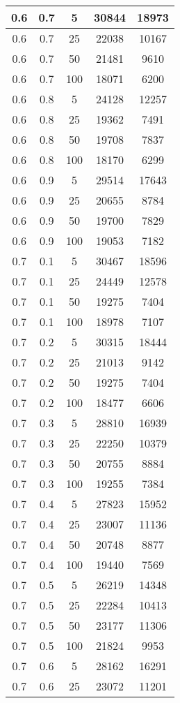 \begin{appendices}
\begin{longtable}[c]{|c|c|c|c|c|}
	\hline
	0.6& 0.7& 5& 30844&  18973\\
	\hline
	0.6& 0.7& 25& 22038&  10167\\
	\hline
	0.6& 0.7& 50& 21481&  9610\\
	\hline
	0.6& 0.7& 100& 18071&  6200\\
	\hline
	0.6& 0.8& 5& 24128&  12257\\
	\hline
	0.6& 0.8& 25& 19362&  7491\\
	\hline
	0.6& 0.8& 50& 19708&  7837\\
	\hline
	0.6& 0.8& 100& 18170&  6299\\
	\hline
	0.6& 0.9& 5& 29514&  17643\\
	\hline
	0.6& 0.9& 25& 20655&  8784\\
	\hline
	0.6& 0.9& 50& 19700&  7829\\
	\hline
	0.6& 0.9& 100& 19053&  7182\\
	\hline
	0.7& 0.1& 5& 30467&  18596\\
	\hline
	0.7& 0.1& 25& 24449&  12578\\
	\hline
	0.7& 0.1& 50& 19275&  7404\\
	\hline
	0.7& 0.1& 100& 18978&  7107\\
	\hline
	0.7& 0.2& 5& 30315&  18444\\
	\hline
	0.7& 0.2& 25& 21013&  9142\\
	\hline
	0.7& 0.2& 50& 19275&  7404\\
	\hline
	0.7& 0.2& 100& 18477&  6606\\
	\hline
	0.7& 0.3& 5& 28810&  16939\\
	\hline
	0.7& 0.3& 25& 22250&  10379\\
	\hline
	0.7& 0.3& 50& 20755&  8884\\
	\hline
	0.7& 0.3& 100& 19255&  7384\\
	\hline
	0.7& 0.4& 5& 27823&  15952\\
	\hline
	0.7& 0.4& 25& 23007&  11136\\
	\hline
	0.7& 0.4& 50& 20748&  8877\\
	\hline
	0.7& 0.4& 100& 19440&  7569\\
	\hline
	0.7& 0.5& 5& 26219&  14348\\
	\hline
	0.7& 0.5& 25& 22284&  10413\\
	\hline
	0.7& 0.5& 50& 23177&  11306\\
	\hline
	0.7& 0.5& 100& 21824&  9953\\
	\hline
	0.7& 0.6& 5& 28162&  16291\\
	\hline
	0.7& 0.6& 25& 23072&  11201\\

\end{longtable}
\end{appendices}
